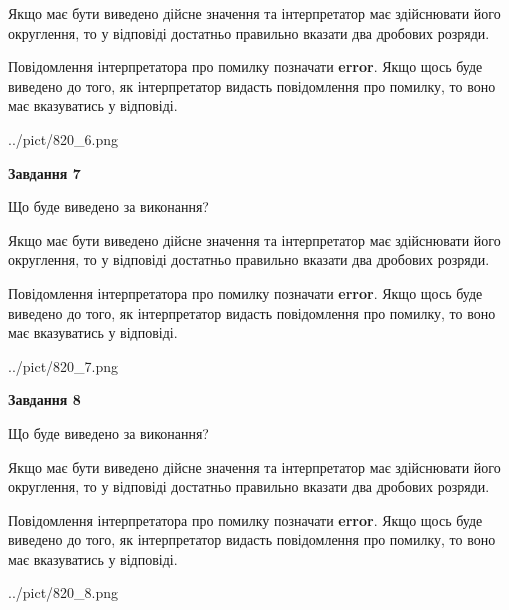 \documentclass[12pt, ukrainian]{article}
\begin{document}
{\begin {Large}
Якщо має бути виведено дійсне значення та інтерпретатор має здійснювати його округлення, 
то у відповіді достатньо правильно вказати два дробових розряди.

Повідомлення інтерпретатора про помилку позначати \textbf{error}.
Якщо щось буде виведено до того, як інтерпретатор видасть повідомлення про помилку, 
то воно має вказуватись у відповіді. \par

\begin{center}
	{../pict/820_6.png}
\end{center}
\newpage

{\begin {center}\textbf{Завдання 7}\end {center}}\par
Що буде виведено за виконання? \par

Якщо має бути виведено дійсне значення та інтерпретатор має здійснювати його округлення, 
то у відповіді достатньо правильно вказати два дробових розряди.

Повідомлення інтерпретатора про помилку позначати \textbf{error}.
Якщо щось буде виведено до того, як інтерпретатор видасть повідомлення про помилку, 
то воно має вказуватись у відповіді. \par

\begin{center}
	{../pict/820_7.png}
\end{center}
\newpage

{\begin {center}\textbf{Завдання 8}\end {center}}\par
Що буде виведено за виконання? \par

Якщо має бути виведено дійсне значення та інтерпретатор має здійснювати його округлення, 
то у відповіді достатньо правильно вказати два дробових розряди.

Повідомлення інтерпретатора про помилку позначати \textbf{error}.
Якщо щось буде виведено до того, як інтерпретатор видасть повідомлення про помилку, 
то воно має вказуватись у відповіді. \par

\begin{center}
	{../pict/820_8.png}
\end{center}
\newpage


\end{Large}}
\end{document}
